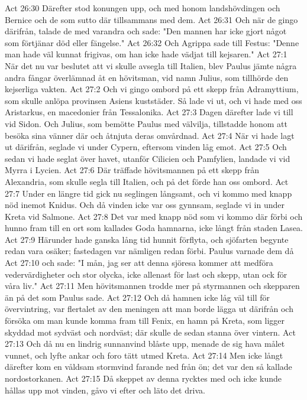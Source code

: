 Act 26:30  Därefter stod konungen upp, och med honom landshövdingen och Bernice och de som sutto där tillsammans med dem.
Act 26:31  Och när de gingo därifrån, talade de med varandra och sade: "Den mannen har icke gjort något som förtjänar död eller fängelse."
Act 26:32  Och Agrippa sade till Festus: "Denne man hade väl kunnat frigivas, om han icke hade vädjat till kejsaren."
Act 27:1  När det nu var beslutet att vi skulle avsegla till Italien, blev Paulus jämte några andra fångar överlämnad åt en hövitsman, vid namn Julius, som tillhörde den kejserliga vakten.
Act 27:2  Och vi gingo ombord på ett skepp från Adramyttium, som skulle anlöpa provinsen Asiens kuststäder. Så lade vi ut, och vi hade med oss Aristarkus, en macedonier från Tessalonika.
Act 27:3  Dagen därefter lade vi till vid Sidon. Och Julius, som bemötte Paulus med välvilja, tillstadde honom att besöka sina vänner där och åtnjuta deras omvårdnad.
Act 27:4  När vi hade lagt ut därifrån, seglade vi under Cypern, eftersom vinden låg emot.
Act 27:5  Och sedan vi hade seglat över havet, utanför Cilicien och Pamfylien, landade vi vid Myrra i Lycien.
Act 27:6  Där träffade hövitsmannen på ett skepp från Alexandria, som skulle segla till Italien, och på det förde han oss ombord.
Act 27:7  Under en längre tid gick nu seglingen långsamt, och vi kommo med knapp nöd inemot Knidus. Och då vinden icke var oss gynnsam, seglade vi in under Kreta vid Salmone.
Act 27:8  Det var med knapp nöd som vi kommo där förbi och hunno fram till en ort som kallades Goda hamnarna, icke långt från staden Lasea.
Act 27:9  Härunder hade ganska lång tid hunnit förflyta, och sjöfarten begynte redan vara osäker; fastedagen var nämligen redan förbi. Paulus varnade dem då
Act 27:10  och sade: "I mån, jag ser att denna sjöresa kommer att medföra vedervärdigheter och stor olycka, icke allenast för last och skepp, utan ock för våra liv."
Act 27:11  Men hövitsmannen trodde mer på styrmannen och skepparen än på det som Paulus sade.
Act 27:12  Och då hamnen icke låg väl till för övervintring, var flertalet av den meningen att man borde lägga ut därifrån och försöka om man kunde komma fram till Fenix, en hamn på Kreta, som ligger skyddad mot sydväst och nordväst; där skulle de sedan stanna över vintern.
Act 27:13  Och då nu en lindrig sunnanvind blåste upp, menade de sig hava målet vunnet, och lyfte ankar och foro tätt utmed Kreta.
Act 27:14  Men icke långt därefter kom en våldsam stormvind farande ned från ön; det var den så kallade nordostorkanen.
Act 27:15  Då skeppet av denna rycktes med och icke kunde hållas upp mot vinden, gåvo vi efter och läto det driva.
